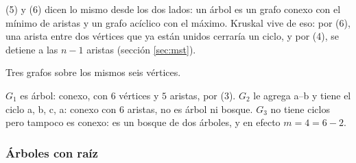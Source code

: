 \documentclass[11pt,letterpaper]{article}
\begin{document}
\begin{idea}
  (5) y (6) dicen lo mismo desde los dos lados: un árbol es un grafo
  conexo con el mínimo de aristas y un grafo acíclico con el máximo.
  Kruskal vive de eso: por (6), una arista entre dos vértices que ya
  están unidos cerraría un ciclo, y por (4), se detiene a las $n - 1$
  aristas (sección \ref{sec:mst}).
\end{idea}

\begin{ejemplo}
  \label{ej:arbol-tres}
  Tres grafos sobre los mismos seis vértices.
  \begin{center}
  \end{center}
  $G_1$ es árbol: conexo, con $6$ vértices y $5$ aristas, por (3).
  $G_2$ le agrega a--b y tiene el ciclo a, b, c, a: conexo con $6$
  aristas, no es árbol ni bosque. $G_3$ no tiene ciclos pero tampoco
  es conexo: es un bosque de dos árboles, y en efecto
  $m = 4 = 6 - 2$.
\end{ejemplo}

\subsubsection*{Árboles con raíz}
\end{document}
